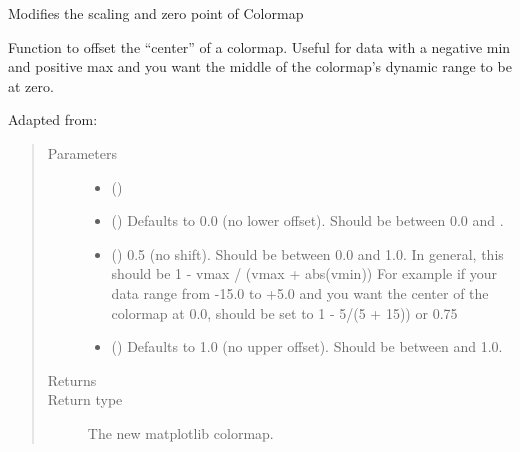\documentclass[letterpaper,10pt,english]{sphinxmanual}
\begin{document}
\begin{fulllineitems}
\label{\detokenize{Backend.plotting_customization:Backend.plotting_customization.shiftedColorMap}}
Modifies the scaling and zero point of Colormap

Function to offset the “center” of a colormap. Useful for
data with a negative min and positive max and you want the
middle of the colormap’s dynamic range to be at zero.

Adapted from: 
\begin{quote}\begin{description}
\item[{Parameters}] \leavevmode\begin{itemize}
\item {} 
 () \textendash{} 

\item {} 
 () \textendash{} Defaults to 0.0 (no lower offset). Should be between
0.0 and .

\item {} 
 () \textendash{} 0.5 (no shift). Should be between 0.0 and 1.0. In
general, this should be  1 - vmax / (vmax + abs(vmin))
For example if your data range from -15.0 to +5.0 and
you want the center of the colormap at 0.0, 
should be set to  1 - 5/(5 + 15)) or 0.75

\item {} 
 () \textendash{} Defaults to 1.0 (no upper offset). Should be between
 and 1.0.

\end{itemize}

\item[{Returns}] \leavevmode
{}

\item[{Return type}] \leavevmode
The new matplotlib colormap.

\end{description}\end{quote}

\end{fulllineitems}
\end{document}
